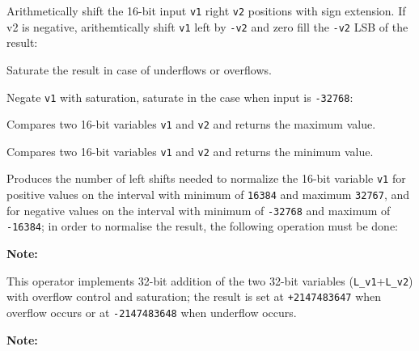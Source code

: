 Arithmetically shift the 16-bit input {\tt v1} right {\tt v2} positions with sign extension.
If v2 is negative, arithemtically shift {\tt v1} left by {\tt -v2} and zero fill the {\tt -v2} LSB of the result:


Saturate the result in case of underflows or overflows.


Negate {\tt v1} with saturation, saturate in the case when input is {\tt -32768}:


 

Compares two 16-bit variables {\tt v1} and {\tt v2} and returns the maximum value.

 

Compares two 16-bit variables {\tt v1} and {\tt v2} and returns the minimum value.


Produces the number of left shifts needed to normalize the 16-bit
variable {\tt v1} for positive values on the interval with minimum
of {\tt 16384} and maximum {\tt 32767}, and for negative values on
the interval with minimum of {\tt -32768} and maximum of {\tt
-16384}; in order to normalise the result, the following operation
must be done:


\textbf{Note:} \hfill {}


This operator implements 32-bit addition of the two 32-bit
variables ({\tt L\_v1}+{\tt L\_v2}) with overflow control and
saturation; the result is set at {\tt +2147483647} when overflow
occurs or at {\tt -2147483648} when underflow occurs.

\textbf{Note:} \hfill {}



